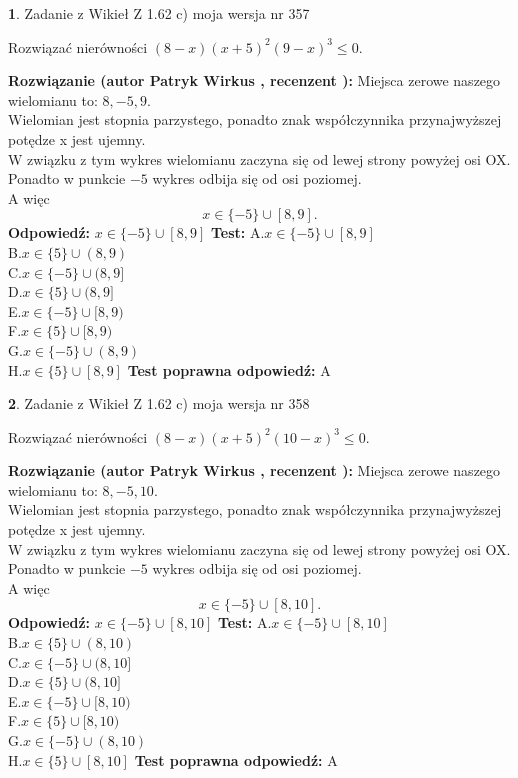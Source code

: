 \documentclass[12pt, a4paper]{article}
\theoremstyle{definition} %
\newtheorem{zad}{}
\newcommand{\zadStart}[1]{\begin{zad}#1\newline}
\newcommand{\zadStop}{\end{zad}}
\newcommand{\rozwStart}[2]{\noindent \textbf{Rozwiązanie (autor #1 , recenzent #2): }\newline}
\newcommand{\rozwStop}{\newline}
\newcommand{\odpStart}{\noindent \textbf{Odpowiedź:}\newline}
\newcommand{\odpStop}{\newline}
\newcommand{\testStart}{\noindent \textbf{Test:}\newline}
\newcommand{\testStop}{\newline}
\newcommand{\kluczStart}{\noindent \textbf{Test poprawna odpowiedź:}\newline}
\newcommand{\kluczStop}{\newline}
\begin{document}
\zadStart{Zadanie z Wikieł Z 1.62 c) moja wersja nr 357}

Rozwiązać nierówności $(8-x)(x+5)^{2}(9-x)^{3}\le0$.
\zadStop
\rozwStart{Patryk Wirkus}{}
Miejsca zerowe naszego wielomianu to: $8, -5, 9$.\\
Wielomian jest stopnia parzystego, ponadto znak współczynnika przy\linebreak najwyższej potędze x jest ujemny.\\ W związku z tym wykres wielomianu zaczyna się od lewej strony powyżej osi OX.\\
Ponadto w punkcie $-5$ wykres odbija się od osi poziomej.\\
A więc $$x \in \{-5\} \cup [8,9].$$
\rozwStop
\odpStart
$x \in \{-5\} \cup [8,9]$
\odpStop
\testStart
A.$x \in \{-5\} \cup [8,9]$\\
B.$x \in \{5\} \cup (8,9)$\\
C.$x \in \{-5\} \cup (8,9]$\\
D.$x \in \{5\} \cup (8,9]$\\
E.$x \in \{-5\} \cup [8,9)$\\
F.$x \in \{5\} \cup [8,9)$\\
G.$x \in \{-5\} \cup (8,9)$\\
H.$x \in \{5\} \cup [8,9]$
\testStop
\kluczStart
A
\kluczStop



\zadStart{Zadanie z Wikieł Z 1.62 c) moja wersja nr 358}

Rozwiązać nierówności $(8-x)(x+5)^{2}(10-x)^{3}\le0$.
\zadStop
\rozwStart{Patryk Wirkus}{}
Miejsca zerowe naszego wielomianu to: $8, -5, 10$.\\
Wielomian jest stopnia parzystego, ponadto znak współczynnika przy\linebreak najwyższej potędze x jest ujemny.\\ W związku z tym wykres wielomianu zaczyna się od lewej strony powyżej osi OX.\\
Ponadto w punkcie $-5$ wykres odbija się od osi poziomej.\\
A więc $$x \in \{-5\} \cup [8,10].$$
\rozwStop
\odpStart
$x \in \{-5\} \cup [8,10]$
\odpStop
\testStart
A.$x \in \{-5\} \cup [8,10]$\\
B.$x \in \{5\} \cup (8,10)$\\
C.$x \in \{-5\} \cup (8,10]$\\
D.$x \in \{5\} \cup (8,10]$\\
E.$x \in \{-5\} \cup [8,10)$\\
F.$x \in \{5\} \cup [8,10)$\\
G.$x \in \{-5\} \cup (8,10)$\\
H.$x \in \{5\} \cup [8,10]$
\testStop
\kluczStart
A
\kluczStop
\end{document}
